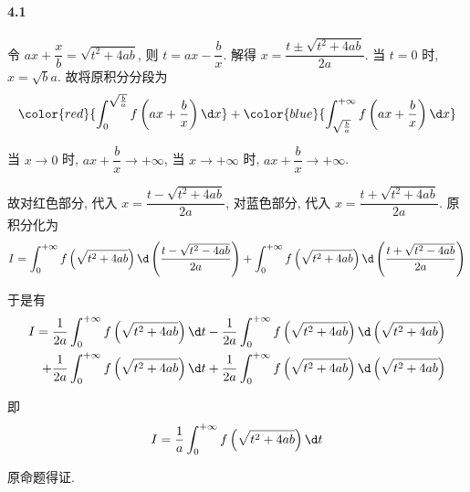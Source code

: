 \paragraph*{4.1} 令 $ax+\dfrac{x}{b}=\sqrt{t^2+4ab}$, 则 $t=ax-\dfrac{b}{x}$. 解得 $x=\dfrac{t\pm\sqrt{t^2+4ab}}{2a}$. 当 $t=0$ 时, $x=\sqrt{b}{a}$. 故将原积分分段为
\[
	{\color{red}{\int_{0}^{\sqrt{\frac{b}{a}}}f\left(ax+\dfrac{b}{x}\right)\d x}}+\color{blue}{\int_{\sqrt{\frac{b}{a}}}^{+\infty}f\left(ax+\dfrac{b}{x}\right)\d x}
\]

当 $x\to 0$ 时, $ax+\dfrac{b}{x}\to +\infty$, 当 $x\to +\infty$ 时, $ax+\dfrac{b}{x}\to+\infty$.

故对红色部分, 代入 $x=\dfrac{t-\sqrt{t^2+4ab}}{2a}$, 对蓝色部分, 代入 $x=\dfrac{t+\sqrt{t^2+4ab}}{2a}$. 原积分化为
\[
	I=\int_{0}^{+\infty}f\left(\sqrt{t^2+4ab}\right)\d\left(\dfrac{t-\sqrt{t^2-4ab}}{2a}\right)+\int_{0}^{+\infty}f\left(\sqrt{t^2+4ab}\right)\d \left(\dfrac{t+\sqrt{t^2-4ab}}{2a}\right)
\]

于是有
\[
	\begin{aligned}
I=\dfrac{1}{2a}\int_{0}^{+\infty}f\left(\sqrt{t^2+4ab}\right)\d t -\dfrac{1}{2a}\int_{0}^{+\infty}f\left(\sqrt{t^2+4ab}\right)\d \left(\sqrt{t^2+4ab}\right)\\+\dfrac{1}{2a}\int_{0}^{+\infty}f\left(\sqrt{t^2+4ab}\right)\d t+\dfrac{1}{2a}\int_{0}^{+\infty}f\left(\sqrt{t^2+4ab}\right)\d \left(\sqrt{t^2+4ab}\right)\\
	\end{aligned}
\]

即
\[
	I=\dfrac{1}{a}\int_{0}^{+\infty}f\left(\sqrt{t^2+4ab}\right)\d t
\]

原命题得证.